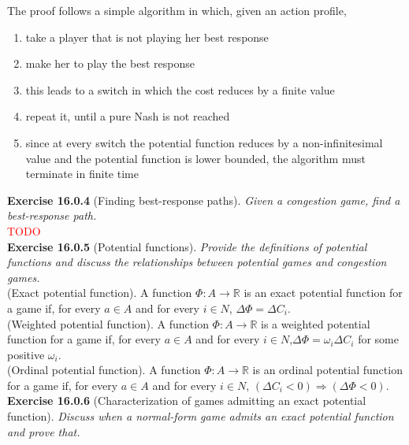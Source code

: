 The proof follows a simple algorithm in which, given an action profile,
\begin{enumerate}
\item take a player that is not playing her best response
\item make her to play the best response
\item this leads to a switch in which the cost reduces by a finite value
\item repeat it, until a pure Nash is not reached
\item since at every switch the potential function reduces by a non-infinitesimal value and the potential function is lower bounded, the algorithm must terminate in finite time
\end{enumerate}

\textbf{Exercise 16.0.4} (Finding best-response paths). \textit{Given a congestion game, find a best-response path.}\\

\textcolor{red}{TODO}\\

\textbf{Exercise 16.0.5} (Potential functions). \textit{Provide the definitions of potential functions and discuss the relationships between potential games and congestion games.}\\

(Exact potential function). A function $\Phi: A \rightarrow \mathbb{R}$ is an exact potential function for a game if, for every $a\in A$ and for every $i \in N$, $\Delta \Phi = \Delta C_i$.\\
(Weighted potential function). A function $\Phi: A \rightarrow \mathbb{R}$ is a weighted potential function for a game if, for every $a \in A $ and for every $i \in N$,$\Delta \Phi = \omega_i \Delta C_i$ for some positive $\omega_i$.\\
(Ordinal potential function). A function $\Phi: A \rightarrow \mathbb{R}$ is an ordinal potential function for a game if, for every $a \in A$ and for every $i \in N$, $(\Delta C_i < 0) \Rightarrow (\Delta \Phi < 0)$.\\

\textbf{Exercise 16.0.6} (Characterization of games admitting an exact potential function). \textit{Discuss when a normal-form game admits an exact potential function and prove that.}\\

